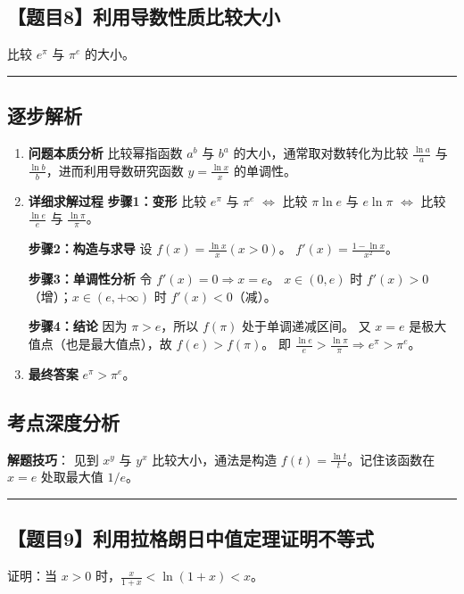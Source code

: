 \documentclass[UTF8]{ctexart}
\newenvironment{redenv}{\color{red}}{}
\newenvironment{detailedanalysis}{%
    \color{red}
    \begin{enumerate}[label=\textbf{第\arabic*步：}, leftmargin=*, align=left, itemsep=1.5ex]
}{%
    \end{enumerate}
}
\newcommand{\problemrule}{\noindent\rule{\textwidth}{1.5pt}\vspace{-0.8em}}
\newcommand{\analysisrule}{\noindent\rule{\textwidth}{0.8pt}\vspace{-0.8em}}
\begin{document}
\subsection*{【题目8】利用导数性质比较大小}
比较 $e^\pi$ 与 $\pi^e$ 的大小。

\begin{redenv}
\analysisrule
\subsection*{逐步解析}

\begin{detailedanalysis}
\item \textbf{问题本质分析}
比较幂指函数 $a^b$ 与 $b^a$ 的大小，通常取对数转化为比较 $\frac{\ln a}{a}$ 与 $\frac{\ln b}{b}$，进而利用导数研究函数 $y = \frac{\ln x}{x}$ 的单调性。

\item \textbf{详细求解过程}
\noindent\textbf{步骤1：变形}
比较 $e^\pi$ 与 $\pi^e$ $\iff$ 比较 $\pi \ln e$ 与 $e \ln \pi$ $\iff$ 比较 $\frac{\ln e}{e}$ 与 $\frac{\ln \pi}{\pi}$。

\noindent\textbf{步骤2：构造与求导}
设 $f(x) = \frac{\ln x}{x} (x>0)$。
$f'(x) = \frac{1 - \ln x}{x^2}$。

\noindent\textbf{步骤3：单调性分析}
令 $f'(x)=0 \Rightarrow x=e$。
$x \in (0, e)$ 时 $f'(x)>0$（增）；$x \in (e, +\infty)$ 时 $f'(x)<0$（减）。

\noindent\textbf{步骤4：结论}
因为 $\pi > e$，所以 $f(\pi)$ 处于单调递减区间。
又 $x=e$ 是极大值点（也是最大值点），故 $f(e) > f(\pi)$。
即 $\frac{\ln e}{e} > \frac{\ln \pi}{\pi} \Rightarrow e^\pi > \pi^e$。

\item \textbf{最终答案}
$e^\pi > \pi^e$。
\end{detailedanalysis}

\subsection*{考点深度分析}
\noindent\textbf{解题技巧}：
见到 $x^y$ 与 $y^x$ 比较大小，通法是构造 $f(t) = \frac{\ln t}{t}$。记住该函数在 $x=e$ 处取最大值 $1/e$。
\end{redenv}

\vspace{2em}
\problemrule
\subsection*{【题目9】利用拉格朗日中值定理证明不等式}
证明：当 $x>0$ 时，$\frac{x}{1+x} < \ln(1+x) < x$。
\end{document}
